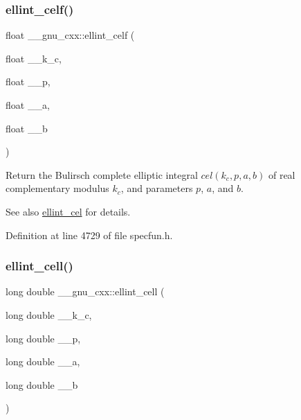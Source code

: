 \subsubsection{\texorpdfstring{ellint\+\_\+celf()}{ellint\_celf()}}
{\footnotesize\ttfamily float \+\_\+\+\_\+gnu\+\_\+cxx\+::ellint\+\_\+celf (\begin{DoxyParamCaption}\item[{float}]{\+\_\+\+\_\+k\+\_\+c,  }\item[{float}]{\+\_\+\+\_\+p,  }\item[{float}]{\+\_\+\+\_\+a,  }\item[{float}]{\+\_\+\+\_\+b }\end{DoxyParamCaption})\hspace{0.3cm}{\ttfamily [inline]}}

Return the Bulirsch complete elliptic integral $ cel(k_c,p,a,b) $ of real complementary modulus $ k_c $, and parameters $ p $, $ a $, and $ b $.

\begin{DoxySeeAlso}{See also}
\hyperlink{group__gnu__math__spec__func_ga6e44a0d90500e56ef4b3aba6efd7e2b0}{ellint\+\_\+cel} for details. 
\end{DoxySeeAlso}


Definition at line 4729 of file specfun.\+h.

\mbox{\label{group__gnu__math__spec__func_gaa5add699fb2b4b02e63f8725a3a79750}} 
\subsubsection{\texorpdfstring{ellint\+\_\+cell()}{ellint\_cell()}}
{\footnotesize\ttfamily long double \+\_\+\+\_\+gnu\+\_\+cxx\+::ellint\+\_\+cell (\begin{DoxyParamCaption}\item[{long double}]{\+\_\+\+\_\+k\+\_\+c,  }\item[{long double}]{\+\_\+\+\_\+p,  }\item[{long double}]{\+\_\+\+\_\+a,  }\item[{long double}]{\+\_\+\+\_\+b }\end{DoxyParamCaption})\hspace{0.3cm}{\ttfamily [inline]}}

